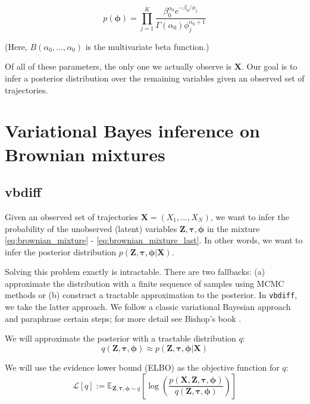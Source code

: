 \documentclass{article}
\let\vec\boldsymbol
\begin{document}
\begin{equation}\label{eq:eqD}
    p \left( \boldsymbol{\phi} \right) = \prod\limits_{j=1}^{K} \frac{\beta_{0}^{\alpha_{0}} e^{-\beta_{0} / \phi_{j}}}{\Gamma (\alpha_{0}) \phi_{j}^{\alpha_{0} + 1}}
\end{equation}

(Here, $B(\alpha_{0}, ..., \alpha_{0})$ is the multivariate beta function.) \newline

Of all of these parameters, the only one we actually observe is $\vec{X}$.
Our goal is to infer a posterior distribution over the remaining variables
given an observed set of trajectories.

\section{Variational Bayes inference on Brownian mixtures}

\subsection{vbdiff}

Given an observed set of trajectories $\vec{X} = (X_{1}, ..., X_{N})$, we
want to infer the probability of the unobserved (latent) variables
$\vec{Z}, \boldsymbol{\tau}, \boldsymbol{\phi}$ in the mixture \ref{eq:brownian_mixture} - \ref{eq:brownian_mixture_last}.
In other words, we want to infer the posterior distribution
$p \left( \vec{Z}, \boldsymbol{\tau}, \boldsymbol{\phi} | \vec{X} \right)$. \newline

Solving this problem exactly is intractable. There are two fallbacks:
(a) approximate the distribution with a finite sequence of samples using
MCMC methods or (b) construct a tractable approximation to the posterior.
In \verb|vbdiff|, we take the latter approach. We follow
a classic variational Bayesian approach and paraphrase certain steps;
for more detail see Bishop's book \cite{bishop2006}. \newline

We will approximate the posterior with a tractable distribution $q$:
\[
    q \left( \vec{Z}, \boldsymbol{\tau}, \boldsymbol{\phi} \right) \approx p \left( \vec{Z}, \boldsymbol{\tau}, \boldsymbol{\phi} | \vec{X} \right)
\]

We will use the evidence lower bound (ELBO) as the objective function for $q$:
\begin{equation}\label{eq:elbo}
    \mathcal{L} \left[ q \right] := \mathbb{E}_{\vec{Z}, \boldsymbol{\tau}, \boldsymbol{\phi} \sim q} \left[
        \log \left(
            \frac{ p \left( \vec{X}, \vec{Z}, \boldsymbol{\tau}, \boldsymbol{\phi} \right)}{ q \left( \vec{Z}, \boldsymbol{\tau}, \boldsymbol{\phi} \right) }
        \right)
    \right]
\end{equation}
\end{document}
